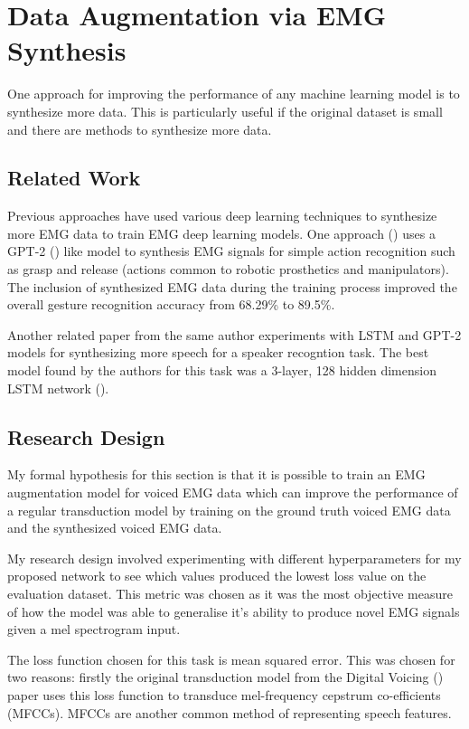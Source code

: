 \section{Data Augmentation via EMG Synthesis}

One approach for improving the performance of any machine learning model
is to synthesize more data. This is particularly useful if the original
dataset is small and there are methods to synthesize more data.

\subsection{Related Work}

Previous approaches have used various deep learning techniques to synthesize
more EMG data to train EMG deep learning models. One approach
(\cite{gpt_2_emg_synth}) uses a GPT-2 (\cite{gpt_2_original}) like model
to synthesis EMG signals for simple action recognition such as grasp and
release (actions common to robotic prosthetics and manipulators). The inclusion
of synthesized EMG data during the training process improved the overall
gesture recognition accuracy from 68.29\% to 89.5\%.

Another related paper from the same author experiments with LSTM and GPT-2
models for synthesizing more speech for a speaker recogntion task. The
best model found by the authors for this task was a
3-layer, 128 hidden dimension LSTM network (\cite{speech_synth_lstm}).

\subsection{Research Design}

My formal hypothesis for this section is that it is possible to train
an EMG augmentation model for voiced EMG data which can improve the
performance of a regular transduction model by training on the
ground truth voiced EMG data and the synthesized voiced EMG data.

My research design involved experimenting with different hyperparameters
for my proposed network to see which values produced the lowest
loss value on the evaluation dataset. This metric was chosen as it
was the most objective measure of how the model was able to generalise
it's ability to produce novel EMG signals given a mel spectrogram input.

The loss function chosen for this task is mean squared error. This was
chosen for two reasons: firstly the original transduction model
from the Digital Voicing (\cite{gaddy2020digital}) paper uses this
loss function to transduce mel-frequency cepstrum co-efficients (MFCCs).
MFCCs are another common method of representing speech features.

